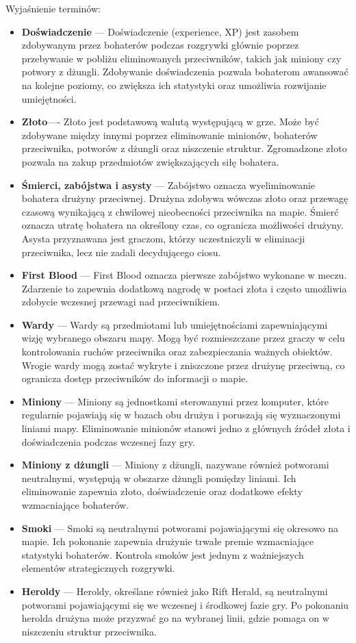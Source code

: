 \documentclass[twoside]{customStyle}
\begin{document}
Wyjaśnienie terminów:
\begin{itemize}
\item \textbf{Doświadczenie} --- Doświadczenie (experience, XP) jest zasobem zdobywanym przez bohaterów podczas rozgrywki głównie poprzez przebywanie w pobliżu eliminowanych przeciwników, takich jak miniony czy potwory z dżungli. Zdobywanie doświadczenia pozwala bohaterom awansować na kolejne poziomy, co zwiększa ich statystyki oraz umożliwia rozwijanie umiejętności.
\item \textbf{Złoto}---- Złoto jest podstawową walutą występującą w grze. Może być zdobywane między innymi poprzez eliminowanie minionów, bohaterów przeciwnika, potworów z dżungli oraz niszczenie struktur. Zgromadzone złoto pozwala na zakup przedmiotów zwiększających siłę bohatera.
\item \textbf{Śmierci, zabójstwa i asysty} --- Zabójstwo oznacza wyeliminowanie bohatera drużyny przeciwnej. Drużyna zdobywa wówczas złoto oraz przewagę czasową wynikającą z chwilowej nieobecności przeciwnika na mapie.
Śmierć oznacza utratę bohatera na określony czas, co ogranicza możliwości drużyny.
Asysta przyznawana jest graczom, którzy uczestniczyli w eliminacji przeciwnika, lecz nie zadali decydującego ciosu.
\item \textbf{First Blood} --- First Blood oznacza pierwsze zabójstwo wykonane w meczu. Zdarzenie to zapewnia dodatkową nagrodę w postaci złota i często umożliwia zdobycie wczesnej przewagi nad przeciwnikiem.
\item \textbf{Wardy} --- Wardy są przedmiotami lub umiejętnościami zapewniającymi wizję wybranego obszaru mapy. Mogą być rozmieszczane przez graczy w celu kontrolowania ruchów przeciwnika oraz zabezpieczania ważnych obiektów. Wrogie wardy mogą zostać wykryte i zniszczone przez drużynę przeciwną, co ogranicza dostęp przeciwników do informacji o mapie.
\item \textbf{Miniony} --- Miniony są jednostkami sterowanymi przez komputer, które regularnie pojawiają się w bazach obu drużyn i poruszają się wyznaczonymi liniami mapy. Eliminowanie minionów stanowi jedno z głównych źródeł złota i doświadczenia podczas wczesnej fazy gry.
\item \textbf{Miniony z dżungli} --- Miniony z dżungli, nazywane również potworami neutralnymi, występują w obszarze dżungli pomiędzy liniami. Ich eliminowanie zapewnia złoto, doświadczenie oraz dodatkowe efekty wzmacniające bohaterów.
\item \textbf{Smoki} --- Smoki są neutralnymi potworami pojawiającymi się okresowo na mapie. Ich pokonanie zapewnia drużynie trwałe premie wzmacniające statystyki bohaterów. Kontrola smoków jest jednym z ważniejszych elementów strategicznych rozgrywki.
\item \textbf{Heroldy} --- Heroldy, określane również jako Rift Herald, są neutralnymi potworami pojawiającymi się we wczesnej i środkowej fazie gry. Po pokonaniu herolda drużyna może przyzwać go na wybranej linii, gdzie pomaga on w niszczeniu struktur przeciwnika.
\end{itemize}
\end{document}
